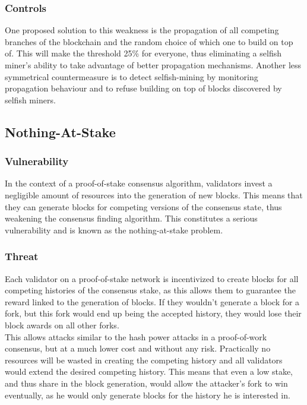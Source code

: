 \documentclass[11pt,a4paper,draft]{article}
\begin{document}
\subsubsection{Controls}

One proposed solution to this weakness is the propagation of all competing branches of the blockchain and the random choice of which one to build on top of. This will make the threshold 25\% for everyone, thus eliminating a selfish miner's ability to take advantage of better propagation mechanisms. Another less symmetrical countermeasure is to detect selfish-mining by monitoring propagation behaviour and to refuse building on top of blocks discovered by selfish miners.\\

\subsection{Nothing-At-Stake}

\subsubsection{Vulnerability}

In the context of a proof-of-stake consensus algorithm, validators invest a negligible amount of resources into the generation of new blocks. This means that they can generate blocks for competing versions of the consensus state, thus weakening the consensus finding algorithm. This constitutes a serious vulnerability and is known as the nothing-at-stake problem.\\

\subsubsection{Threat}

Each validator on a proof-of-stake network is incentivized to create blocks for all competing histories of the consensus stake, as this allows them to guarantee the reward linked to the generation of blocks. If they wouldn't generate a block for a fork, but this fork would end up being the accepted history, they would lose their block awards on all other forks.\\

This allows attacks similar to the hash power attacks in a proof-of-work consensus, but at a much lower cost and without any risk. Practically no resources will be wasted in creating the competing history and all validators would extend the desired competing history. This means that even a low stake, and thus share in the block generation, would allow the attacker's fork to win eventually, as he would only generate blocks for the history he is interested in.\\
\end{document}
